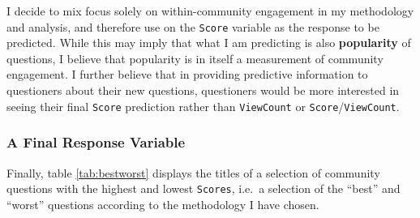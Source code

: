 \documentclass[11pt,preprint, authoryear]{article}
\numberwithin{equation}{section}
\begin{document}
I decide to mix focus solely on within-community engagement in my
methodology and analysis, and therefore use on the \texttt{Score}
variable as the response to be predicted. While this may imply that what
I am predicting is also \textbf{popularity} of questions, I believe that
popularity is in itself a measurement of community engagement. I further
believe that in providing predictive information to questioners about
their new questions, questioners would be more interested in seeing
their final \texttt{Score} prediction rather than \texttt{ViewCount} or
\texttt{Score}/\texttt{ViewCount}.

\subsubsection{A Final Response
Variable}\label{a-final-response-variable}

Finally, table \ref{tab:bestworst} displays the titles of a selection of
community questions with the highest and lowest \texttt{Scores}, i.e.~a
selection of the ``best'' and ``worst'' questions according to the
methodology I have chosen.

\footnotesize
\end{document}
